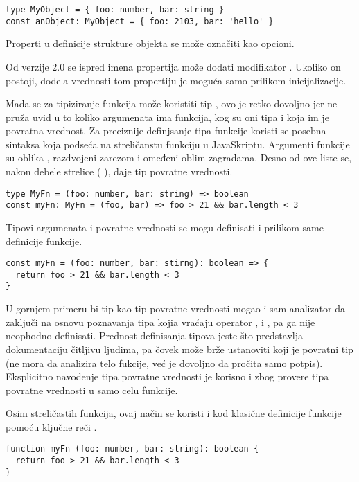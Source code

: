 \begin{verbatim}
type MyObject = { foo: number, bar: string }
const anObject: MyObject = { foo: 2103, bar: 'hello' }
\end{verbatim}

Properti u definicije strukture objekta se može označiti kao opcioni.

Od verzije 2.0 se ispred imena propertija može dodati modifikator .
Ukoliko on postoji, dodela vrednosti tom propertiju je moguća samo prilikom inicijalizacije.

Mada se za tipiziranje funkcija može koristiti tip , ovo je retko dovoljno jer ne pruža uvid u to koliko argumenata ima funkcija, kog su oni tipa i koja im je povratna vrednost.
Za preciznije definjsanje tipa funkcije koristi se posebna sintaksa koja podseća na streličanstu funkciju u JavaSkriptu.
Argumenti funkcije su oblika , razdvojeni zarezom i omeđeni oblim zagradama.
Desno od ove liste se, nakon debele strelice ( \code{=>}), daje tip povratne vrednosti.

\begin{verbatim}
type MyFn = (foo: number, bar: string) => boolean
const myFn: MyFn = (foo, bar) => foo > 21 && bar.length < 3
\end{verbatim}

Tipovi argumenata i povratne vrednosti se mogu definisati i prilikom same definicije funkcije.

\begin{verbatim}
const myFn = (foo: number, bar: stirng): boolean => {
  return foo > 21 && bar.length < 3
}
\end{verbatim}

U gornjem primeru bi tip  kao tip povratne vrednosti mogao i sam analizator da zaključi na osnovu poznavanja tipa kojia vraćaju operator \code{\&\&}, \code{>} i \code{<}, pa ga nije neophodno definisati.
Prednost definisanja tipova jeste što predstavlja dokumentaciju čitljivu ljudima, pa čovek može brže ustanoviti koji je povratni tip (ne mora da analizira telo fukcije, već je dovoljno da pročita samo potpis).
Eksplicitno navođenje tipa povratne vrednosti je korisno i zbog provere tipa povratne vrednosti u samo celu funkcije.

Osim streličastih funkcija, ovaj način se koristi i kod klasične definicije funkcije pomoću ključne reči .

\begin{verbatim}
function myFn (foo: number, bar: string): boolean {
  return foo > 21 && bar.length < 3
}
\end{verbatim}

